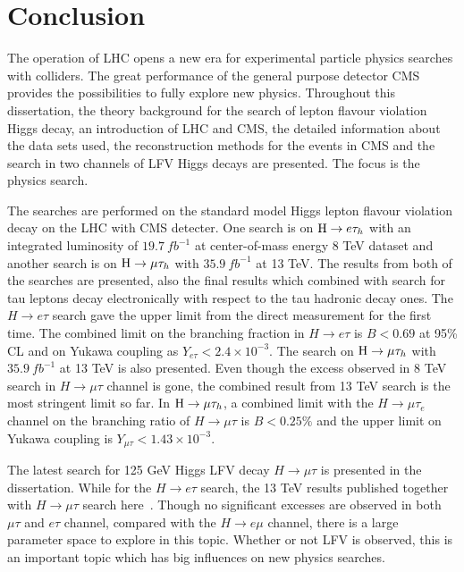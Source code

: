 
\chapter{Conclusion}

The operation of LHC opens a new era for experimental particle physics searches with colliders. The great performance of the general purpose detector CMS provides the possibilities to fully explore new physics. Throughout this dissertation, the theory background for the search of lepton flavour violation Higgs decay, an introduction of LHC and CMS, the detailed information about the data sets used, the reconstruction methods for the events in CMS and the search in two channels of LFV Higgs decays are presented. The focus is the physics search. 

  
The searches are performed on the standard model Higgs lepton flavour violation decay on the LHC with CMS detecter. One search is on $\mathrm{H} \to e \tau_{h}$ with an integrated luminosity of $19.7~fb^{-1}$ at center-of-mass energy 8 TeV dataset and another search is on $\mathrm{H}\to \mu\tau_{h}$ with $35.9~fb^{-1}$ at 13 TeV. The results from both of the searches are presented, also the final results which combined with search for tau leptons decay electronically with respect to the tau hadronic decay ones. The $H \to e \tau$ search gave the upper limit from the direct measurement for the first time. The combined limit on the branching fraction in $H \to e\tau$ is $B<0.69$ at 95\% CL and on Yukawa coupling as $Y_{e\tau}<2.4\times10^{-3}$. The search on $\mathrm{H}\to \mu\tau_{h}$ with $35.9~fb^{-1}$ at 13 TeV is also presented. Even though the excess observed in 8 TeV search in $H \to \mu \tau$ channel is gone, the combined result from 13 TeV search is the most stringent limit so far. In $\mathrm{H}\to \mu\tau_{h}$, a combined limit with the $H \to \mu \tau_{e}$ channel on the branching ratio of $H \to \mu\tau$ is $B<0.25\%$ and the upper limit on Yukawa coupling is $Y_{\mu\tau}<1.43\times10^{-3}$.   

The latest search for 125 GeV Higgs LFV decay $H \to \mu \tau$ is presented in the dissertation. While for the $H \to e \tau$ search, the 13 TeV results published together with $H \to \mu \tau$ search here~\cite{Sirunyan2018}. Though no significant excesses are observed in both $\mu\tau$ and $e\tau$ channel, compared with the $H \to e \mu$ channel, there is a large parameter space to explore in this topic. Whether or not LFV is observed, this is an important topic which has big influences on new physics searches.  









